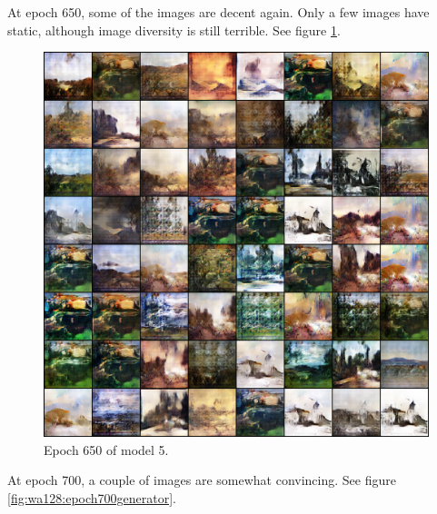 \documentclass[11pt,letterpaper]{article}
\begin{document}
				At epoch 650, some of the images are decent again.
				Only a few images have static, although image diversity is still terrible.
				See figure \ref{fig:wa128:epoch650generator}.
				\begin{figure}
					\centering
					\includegraphics[width=1.0\linewidth]{results/model5/epoch650_generator}
					\caption{Epoch 650 of model 5.}
					\label{fig:wa128:epoch650generator}
				\end{figure}

				At epoch 700, a couple of images are somewhat convincing.
				See figure \ref{fig:wa128:epoch700generator}.
\end{document}
